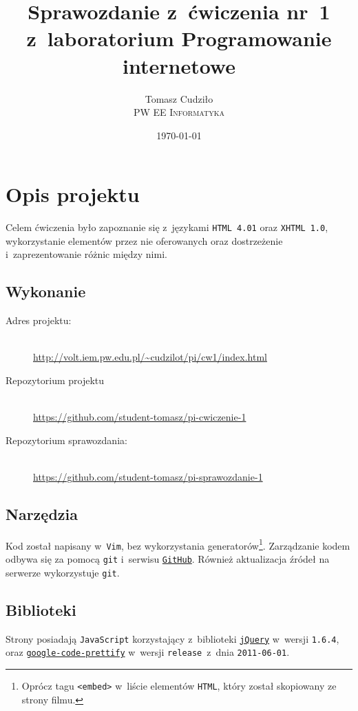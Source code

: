 \documentclass[10pt,a4paper]{article}
\newcommand{\f}[1]{\texttt{#1}}
\begin{document}
\title{
  Sprawozdanie z~ćwiczenia nr~1\\z~laboratorium Programowanie internetowe
}
\author{
  Tomasz Cudziło\\
  \textsc{PW EE Informatyka}\\[10pt]
}
\date{\today}
\maketitle

\section{Opis projektu}
Celem ćwiczenia było zapoznanie się z~językami \f{HTML 4.01} oraz \f{XHTML 1.0},
wykorzystanie elementów przez nie oferowanych oraz dostrzeżenie
i~zaprezentowanie różnic między nimi.

\subsection{Wykonanie}
\begin{description}
  \item[Adres projektu:] \hfill \\
  \url{http://volt.iem.pw.edu.pl/~cudzilot/pi/cw1/index.html}
  \item[Repozytorium projektu] \hfill \\
  \url{https://github.com/student-tomasz/pi-cwiczenie-1}
  \item[Repozytorium sprawozdania:] \hfill \\
  \url{https://github.com/student-tomasz/pi-sprawozdanie-1}
\end{description}

\subsection{Narzędzia}
Kod został napisany w~\f{Vim}, bez wykorzystania generatorów\footnote{Oprócz
tagu \f{<embed>} w~liście elementów \f{HTML}, który został skopiowany ze strony
filmu.}. Zarządzanie kodem odbywa się za pomocą \f{git} i~serwisu
\f{\href{https://github.com/}{GitHub}}. Również aktualizacja źródeł na serwerze
wykorzystuje \f{git}.

\subsection{Biblioteki}
Strony posiadają \f{JavaScript} korzystający z~biblioteki
\f{\href{http://jquery.com/}{jQuery}} w~wersji \f{1.6.4}, oraz
\f{\href{http://code.google.com/p/google-code-prettify/}{google-code-prettify}}
w~wersji \f{release}~z~dnia \f{2011-06-01}.
\end{document}
